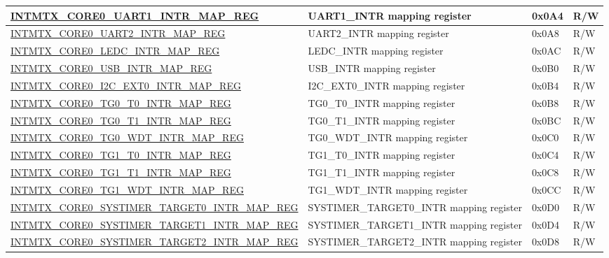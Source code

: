 \begin{longtable}{ | p{10cm} | p{10cm} | p{1.3cm} | p{1cm} | }
\hyperref[regdesc:INTMTXCORE0UART1INTRMAPREG]{INTMTX\_CORE0\_UART1\_INTR\_MAP\_REG} & UART1\_INTR mapping register & 0x0A4 & R/W  \\ \hline
\hyperref[regdesc:INTMTXCORE0UART2INTRMAPREG]{INTMTX\_CORE0\_UART2\_INTR\_MAP\_REG} & UART2\_INTR mapping register & 0x0A8 & R/W  \\ \hline
\hyperref[regdesc:INTMTXCORE0LEDCINTRMAPREG]{INTMTX\_CORE0\_LEDC\_INTR\_MAP\_REG} & LEDC\_INTR mapping register & 0x0AC & R/W  \\ \hline
\hyperref[regdesc:INTMTXCORE0USBINTRMAPREG]{INTMTX\_CORE0\_USB\_INTR\_MAP\_REG} & USB\_INTR mapping register & 0x0B0 & R/W  \\ \hline
\hyperref[regdesc:INTMTXCORE0I2CEXT0INTRMAPREG]{INTMTX\_CORE0\_I2C\_EXT0\_INTR\_MAP\_REG} & I2C\_EXT0\_INTR mapping register & 0x0B4 & R/W  \\ \hline
\hyperref[regdesc:INTMTXCORE0TG0T0INTRMAPREG]{INTMTX\_CORE0\_TG0\_T0\_INTR\_MAP\_REG} & TG0\_T0\_INTR mapping register & 0x0B8 & R/W  \\ \hline
\hyperref[regdesc:INTMTXCORE0TG0T1INTRMAPREG]{INTMTX\_CORE0\_TG0\_T1\_INTR\_MAP\_REG} & TG0\_T1\_INTR mapping register & 0x0BC & R/W  \\ \hline
\hyperref[regdesc:INTMTXCORE0TG0WDTINTRMAPREG]{INTMTX\_CORE0\_TG0\_WDT\_INTR\_MAP\_REG} & TG0\_WDT\_INTR mapping register & 0x0C0 & R/W  \\ \hline
\hyperref[regdesc:INTMTXCORE0TG1T0INTRMAPREG]{INTMTX\_CORE0\_TG1\_T0\_INTR\_MAP\_REG} & TG1\_T0\_INTR mapping register & 0x0C4 & R/W  \\ \hline
\hyperref[regdesc:INTMTXCORE0TG1T1INTRMAPREG]{INTMTX\_CORE0\_TG1\_T1\_INTR\_MAP\_REG} & TG1\_T1\_INTR mapping register & 0x0C8 & R/W  \\ \hline
\hyperref[regdesc:INTMTXCORE0TG1WDTINTRMAPREG]{INTMTX\_CORE0\_TG1\_WDT\_INTR\_MAP\_REG} & TG1\_WDT\_INTR mapping register & 0x0CC & R/W  \\ \hline
\hyperref[regdesc:INTMTXCORE0SYSTIMERTARGET0INTRMAPREG]{INTMTX\_CORE0\_SYSTIMER\_TARGET0\_INTR\_MAP\_REG} & SYSTIMER\_TARGET0\_INTR mapping register & 0x0D0 & R/W  \\ \hline
\hyperref[regdesc:INTMTXCORE0SYSTIMERTARGET1INTRMAPREG]{INTMTX\_CORE0\_SYSTIMER\_TARGET1\_INTR\_MAP\_REG} & SYSTIMER\_TARGET1\_INTR mapping register & 0x0D4 & R/W  \\ \hline
\hyperref[regdesc:INTMTXCORE0SYSTIMERTARGET2INTRMAPREG]{INTMTX\_CORE0\_SYSTIMER\_TARGET2\_INTR\_MAP\_REG} & SYSTIMER\_TARGET2\_INTR mapping register & 0x0D8 & R/W  \\ \hline

\end{longtable}
